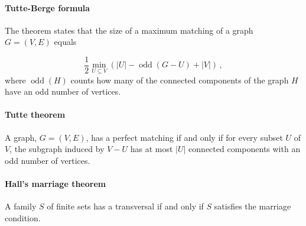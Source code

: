 \paragraph{Tutte-Berge formula}
The theorem states that the size of a maximum matching of a graph $G=(V,E)$ equals

$${\frac {1}{2}}\min _{U\subseteq V}\left(|U|-\operatorname {odd} (G-U)+|V|\right)\,,$$
where $\operatorname {odd} (H)$ counts how many of the connected components of the graph $H$ have an odd number of vertices.

\paragraph{Tutte theorem}

A graph, $G = (V, E)$, has a perfect matching if and only if for every subset $U$ of $V$, the subgraph induced by $V-U$ has at most $|U|$ connected components with an odd number of vertices.

\paragraph{Hall's marriage theorem}

A family $S$ of finite sets has a transversal if and only if $S$ satisfies the marriage condition.
